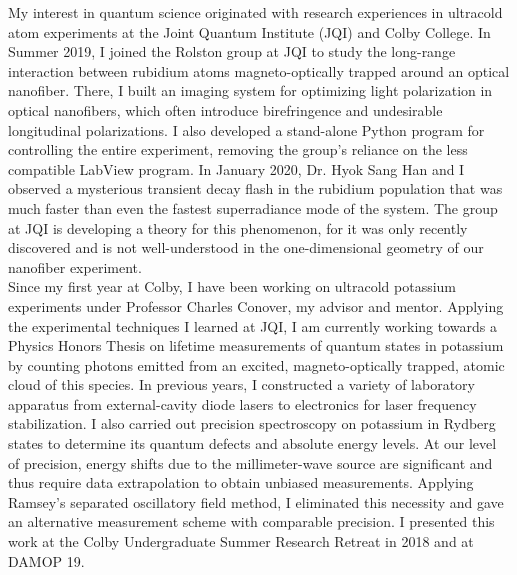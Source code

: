 My interest in quantum science originated with research experiences in ultracold atom experiments at the Joint Quantum Institute (JQI) and Colby College. In Summer 2019, I joined the Rolston group at JQI to study the long-range interaction between rubidium atoms magneto-optically trapped around an optical nanofiber. There, I built an imaging system for optimizing light polarization in optical nanofibers, which often introduce birefringence and undesirable longitudinal polarizations. I also developed a stand-alone Python program for controlling the entire experiment, removing the group's reliance on the less compatible LabView program. In January 2020, Dr. Hyok Sang Han and I observed a mysterious transient decay flash in the rubidium population that was much faster than even the fastest superradiance mode of the system.  The group at JQI is developing a theory for this phenomenon, for it was only recently discovered and is not well-understood in the one-dimensional geometry of our nanofiber experiment.   \\ 

Since my first year at Colby, I have been working on ultracold potassium experiments under Professor Charles Conover, my advisor and mentor. Applying the experimental techniques I learned at JQI, I am currently working towards a Physics Honors Thesis on lifetime measurements of quantum states in potassium by counting photons emitted from an excited, magneto-optically trapped, atomic cloud of this species. In previous years, I constructed a variety of laboratory apparatus from external-cavity diode lasers to electronics for laser frequency stabilization. I also carried out precision spectroscopy on potassium in Rydberg states to determine its quantum defects and absolute energy levels. At our level of precision, energy shifts due to the millimeter-wave source are significant and thus require data extrapolation to obtain unbiased measurements. Applying Ramsey's separated oscillatory field method, I eliminated this necessity and gave an alternative measurement scheme with comparable precision. I presented this work at the Colby Undergraduate Summer Research Retreat in 2018 and at DAMOP 19.  \\

